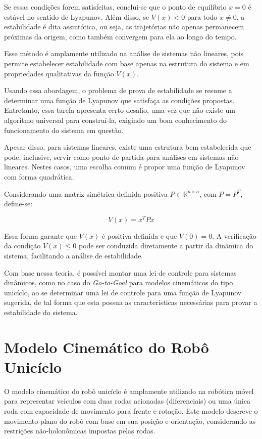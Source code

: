 \documentclass[conference]{IEEEtran}
\begin{document}
Se essas condições forem satisfeitas, conclui-se que o ponto de equilíbrio $x = 0$ é estável no sentido de Lyapunov. Além disso, se $\dot{V}(x) < 0$ para todo $x \neq 0$, a estabilidade é dita assintótica, ou seja, as trajetórias não apenas permanecem próximas da origem, como também convergem para ela ao longo do tempo.

Esse método é amplamente utilizado na análise de sistemas não lineares, pois permite estabelecer estabilidade com base apenas na estrutura do sistema e em propriedades qualitativas da função $V(x)$.

Usando essa abordagem, o problema de prova de estabilidade se resume a determinar uma função de Lyapunov que satisfaça as condições propostas. Entretanto, essa tarefa apresenta certo desafio, uma vez que não existe um algoritmo universal para construí-la, exigindo um bom conhecimento do funcionamento do sistema em questão.

Apesar disso, para sistemas lineares, existe uma estrutura bem estabelecida que pode, inclusive, servir como ponto de partida para análises em sistemas não lineares. Nestes casos, uma escolha comum é propor uma função de Lyapunov com forma quadrática.

Considerando uma matriz simétrica definida positiva $P \in \mathbb{R}^{n \times n}$, com $P = P^T$, define-se:

\begin{equation}
    V(x) = x^T P x
    \label{eq:Forma_quadratica}
\end{equation}

Essa forma garante que $V(x)$ é positiva definida e que $V(0) = 0$. A verificação da condição $\dot{V}(x) \leq 0$ pode ser conduzida diretamente a partir da dinâmica do sistema, facilitando a análise de estabilidade.

Com base nessa teoria, é possível montar uma lei de controle para sistemas dinâmicos, como no caso do \textit{Go-to-Goal} para modelos cinemáticos do tipo unicíclo, ao se determinar uma lei de controle para uma função de Lyapunov sugerida, de tal forma que esta possua as características necessárias para provar a estabilidade do sistema.

\section{Modelo Cinemático do Robô Unicíclo}

O modelo cinemático do robô unicíclo é amplamente utilizado na robótica móvel para representar veículos com duas rodas acionadas (diferenciais) ou uma única roda com capacidade de movimento para frente e rotação. Este modelo descreve o movimento plano do robô com base em sua posição e orientação, considerando as restrições não-holonômicas impostas pelas rodas.
\end{document}
